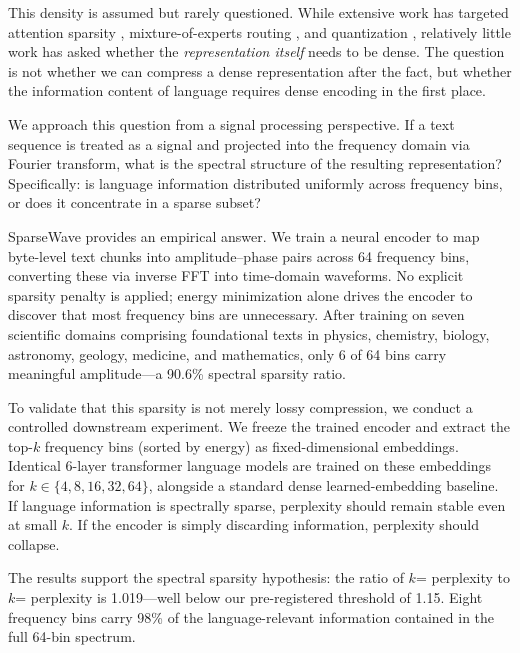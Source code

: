 \documentclass[10pt,twocolumn]{article}
\begin{document}
This density is assumed but rarely questioned. While extensive work has targeted attention sparsity \cite{child2019generating}, mixture-of-experts routing \cite{fedus2022switch}, and quantization \cite{dettmers2022gpt3}, relatively little work has asked whether the \emph{representation itself} needs to be dense. The question is not whether we can compress a dense representation after the fact, but whether the information content of language requires dense encoding in the first place.

We approach this question from a signal processing perspective. If a text sequence is treated as a signal and projected into the frequency domain via Fourier transform, what is the spectral structure of the resulting representation? Specifically: is language information distributed uniformly across frequency bins, or does it concentrate in a sparse subset?

SparseWave provides an empirical answer. We train a neural encoder to map byte-level text chunks into amplitude--phase pairs across 64 frequency bins, converting these via inverse FFT into time-domain waveforms. No explicit sparsity penalty is applied; energy minimization alone drives the encoder to discover that most frequency bins are unnecessary. After training on seven scientific domains comprising foundational texts in physics, chemistry, biology, astronomy, geology, medicine, and mathematics, only 6 of 64 bins carry meaningful amplitude---a 90.6\% spectral sparsity ratio.

To validate that this sparsity is not merely lossy compression, we conduct a controlled downstream experiment. We freeze the trained encoder and extract the top-$k$ frequency bins (sorted by energy) as fixed-dimensional embeddings. Identical 6-layer transformer language models are trained on these embeddings for $k \in \{4, 8, 16, 32, 64\}$, alongside a standard dense learned-embedding baseline. If language information is spectrally sparse, perplexity should remain stable even at small $k$. If the encoder is simply discarding information, perplexity should collapse.

The results support the spectral sparsity hypothesis: the ratio of $k$\!= perplexity to $k$\!= perplexity is 1.019---well below our pre-registered threshold of 1.15. Eight frequency bins carry 98\% of the language-relevant information contained in the full 64-bin spectrum.
\end{document}
